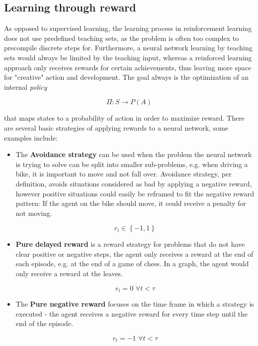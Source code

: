 \documentclass[12pt,a4]{article}
\begin{document}
\subsection{Learning through reward}

As opposed to supervised learning, the learning process in reinforcement learning does not use predefined teaching sets, as the problem is often too complex to precompile discrete steps for. Furthermore, a neural network learning by teaching sets would always be limited by the teaching input, whereas a reinforced learning approach only receives rewards for certain achievements, thus leaving more space for "creative" action and development.
The goal always is the optimization of an internal \emph{policy}

\[\Pi :S \rightarrow P(A)\]

that maps states to a probability of action in order to maximize reward. There are several basic strategies of applying rewards to a neural network, some examples include:

\begin{itemize}
   
     \item The \textbf{Avoidance strategy} can be used when the problem the neural network is trying to solve can be split into smaller sub-problems, e.g. when driving a bike, it is important to move and not fall over. Avoidance strategy, per definition, avoids situations considered as bad by applying a negative reward, however positive situations could easily be reframed to fit the negative reward pattern: If the agent on the bike should move, it could receive a penalty for not moving.
     
     \[r_{t}\in\left \{ -1,1 \right \}\]
     
    \item \textbf{Pure delayed reward} is a reward strategy for problems that do not have clear positive or negative steps, the agent only receives a reward at the end of each episode, e.g. at the end of a game of chess. In a graph, the agent would only receive a reward at the leaves.
    
    \[r_{t}=0\,\,\forall t<\tau\]
    
    \item The \textbf{Pure negative reward} focuses on the time frame in which a strategy is executed - the agent receives a negative reward for every time step until the end of the episode.
    
    \[r_{t}=-1\,\,\forall t<\tau\]
    
   \end{itemize}
\end{document}

